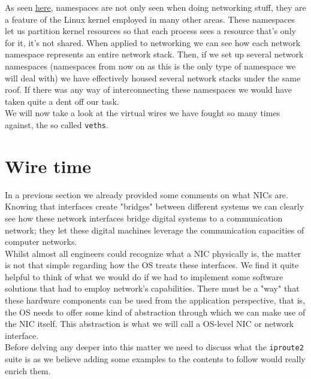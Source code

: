         As seen \href{https://en.wikipedia.org/wiki/Linux_namespaces}{here}, namespaces are not only seen when doing networking stuff, they are a feature of the Linux kernel employed in many other areas. These namespaces let us partition kernel resources so that each process sees a resource that's only for it, it's not shared. When applied to networking we can see how each network namespace represents an entire network stack. Then, if we set up several network namespaces (namespaces from now on as this is the only type of namespace we will deal with) we have effectively housed several network stacks under the same roof. If there was any way of interconnecting these namespaces we would have taken quite a dent off our task.\\

        We will now take a look at the virtual wires we have fought so many times against, the so called \texttt{veths}.\\

    \section{Wire time}
        In a previous section we already provided some comments on what NICs are. Knowing that interfaces create "bridges" between different systems we can clearly see how these network interfaces bridge digital systems to a communication network; they let these digital machines leverage the communication capacities of computer networks.\\

        Whilst almost all engineers could recognize what a NIC physically is, the matter is not that simple regarding how the OS treats these interfaces. We find it quite helpful to think of what we would do if we had to implement some software solutions that had to employ network's capabilities. There must be a "way" that these hardware components can be used from the application perspective, that is, the OS needs to offer some kind of abstraction through which we can make use of the NIC itself. This abstraction is what we will call a OS-level NIC or network interface.\\

        Before delving any deeper into this matter we need to discuss what the \texttt{iproute2} suite is as we believe adding some examples to the contents to follow would really enrich them.


